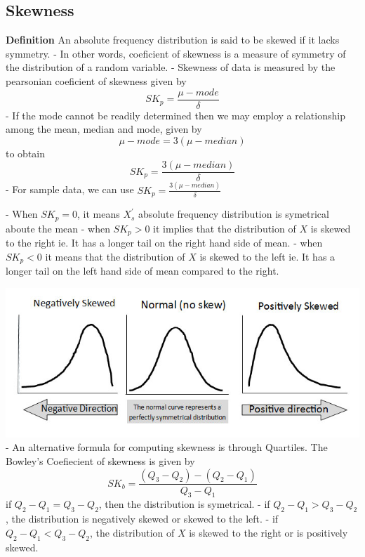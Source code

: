 \documentclass[12pt]{article}
\begin{document}
\subsection{Skewness}
\textbf{Definition} An absolute frequency distribution is said to be skewed if it lacks symmetry.
- In other words, coeficient of skewness is a measure of symmetry of the distribution of a random variable.
- Skewness of data is measured by the pearsonian coeficient of skewness given by
\begin{equation}
    SK_p = \frac{\mu - mode}{\delta}
\end{equation}
- If the mode cannot be readily determined then we may employ a relationship among the mean, median and mode, given by
\begin{equation}
    \mu - mode = 3(\mu - median)
\end{equation}
to obtain
\begin{equation}
    SK_p = \frac{3(\mu - median)}{\delta}
\end{equation}
- For sample data, we can use $SK_p = \frac{3(\mu - median)}{\delta}$

- When $SK_p = 0$, it means $X_s^{'}$ absolute frequency distribution is symetrical aboute the mean
- when $SK_p > 0$ it implies that the distribution of $X$ is skewed to the right ie. It has a longer tail on the right hand side of mean.
- when $SK_p < 0$ it means that the distribution of $X$ is skewed to the left ie. It has a longer tail on the left hand side of mean compared to the right.

\hbox{\includegraphics[width=\textwidth]{measure-of-skewness.jpg}}
- An alternative formula for computing skewness is through Quartiles. The Bowley's Coefiecient of skewness is given by
\begin{equation}
    SK_b = \frac{(Q_3 - Q_2)-(Q_2 - Q_1)}{Q_3 - Q_1}
\end{equation}
if $Q_2 - Q_1 = Q_3 - Q_2$, then the distribution is symetrical.
- if $Q_2 - Q_1 > Q_3 - Q_2$, the distribution is negatively skewed or skewed to the left.
- if $Q_2 - Q_1 < Q_3 - Q_2$, the distribution of $X$ is skewed to the right or is positively skewed.
\end{document}
